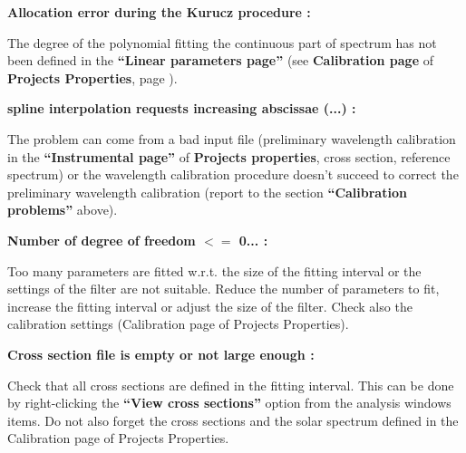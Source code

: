 \textbf{Allocation error during the Kurucz procedure :}

\hspace{1cm}\parbox{11.5cm}{The degree of the polynomial fitting the continuous part of spectrum has not been defined in the \textbf{``Linear parameters page''} (see \textbf{Calibration page} of \textbf{Projects Properties}, page \pageref{sec:projects_calibration_page}).}

\textbf{spline interpolation requests increasing abscissae (...) :}

\hspace{1cm}\parbox{11.5cm}{The problem can come from a bad input file (preliminary wavelength calibration in the \textbf{``Instrumental page''} of \textbf{Projects properties}, cross section, reference spectrum) or the wavelength calibration procedure doesn't succeed to correct the preliminary wavelength calibration (report to the section \textbf{``Calibration problems''} above).}

\textbf{Number of degree of freedom $<=$ 0... :}

\hspace{1cm}\parbox{11.5cm}{Too many parameters are fitted w.r.t. the size of the fitting interval or the settings of the filter are not suitable.  Reduce the number of parameters to fit, increase the fitting interval or adjust the size of the filter.  Check also the calibration settings (Calibration page of Projects Properties).}

\textbf{Cross section file is empty or not large enough :}

\hspace{1cm}\parbox{11.5cm}{Check that all cross sections are defined in the fitting interval.  This can be done by right-clicking the \textbf{``View cross sections''} option from the analysis windows items.   Do not also forget the cross sections and the solar spectrum defined in the Calibration page of Projects Properties.}


